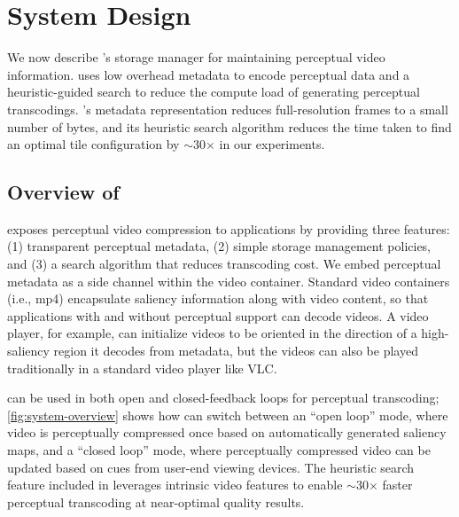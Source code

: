 
\section{\nameStore System Design}
\label{sec:system}


We now describe \name's storage manager for maintaining perceptual video information.
\nameStore uses low overhead metadata to encode perceptual data and a heuristic-guided search to reduce the compute load of generating perceptual transcodings.
\nameStore's metadata representation reduces full-resolution frames to a small number of bytes, and its heuristic search algorithm reduces the time taken to find an optimal tile configuration by $\sim$30$\times$ in our experiments.

\subsection{Overview of \nameStore}
\label{sec:system:goals}

\nameStore exposes perceptual video compression to applications by providing three features: (1) transparent perceptual metadata, (2) simple storage management policies, and (3) a search algorithm that reduces transcoding cost.
We embed perceptual metadata as a side channel within the video container.
Standard video containers (i.e., mp4) encapsulate saliency information along with video content, so that applications with and without perceptual support can decode \name videos.
A \threesixty video player, for example, can initialize videos to be oriented in the direction of a high-saliency region it decodes from \name metadata, but the videos can also be played traditionally in a standard video player like VLC. %

\systemOverviewFigure

\nameStore can be used in both open and closed-feedback loops for perceptual transcoding; \ref{fig:system-overview} shows how \nameStore can switch between an ``open loop'' mode, where video is perceptually compressed once based on automatically generated saliency maps, and a ``closed loop'' mode, where perceptually compressed video can be updated based on cues from user-end viewing devices.
The heuristic search feature included in \nameStore leverages intrinsic video features to enable $\sim$30$\times$ faster perceptual transcoding at near-optimal quality results.

